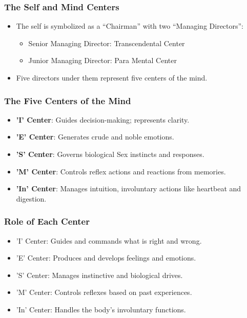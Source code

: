 \begin{frame}[fragile]\frametitle{The Self and Mind Centers}
    \begin{itemize}
        \item The self is symbolized as a ``Chairman'' with two ``Managing Directors'':
        \begin{itemize}
            \item Senior Managing Director: Transcendental Center
            \item Junior Managing Director: Para Mental Center
        \end{itemize}
        \item Five directors under them represent five centers of the mind.
    \end{itemize}
\end{frame}

\begin{frame}[fragile]\frametitle{The Five Centers of the Mind}
    \begin{itemize}
        \item \textbf{'I' Center}: Guides decision-making; represents clarity.
        \item \textbf{'E' Center}: Generates crude and noble emotions.
        \item \textbf{'S' Center}: Governs biological Sex instincts and responses.
        \item \textbf{'M' Center}: Controls reflex actions and reactions from memories.
        \item \textbf{'In' Center}: Manages intuition, involuntary actions like heartbeat and digestion.
    \end{itemize}
\end{frame}

\begin{frame}[fragile]\frametitle{Role of Each Center}
    \begin{itemize}
        \item 'I'  Center: Guides and commands what is right and wrong.
        \item 'E' Center: Produces and develops feelings and emotions.
        \item 'S' Center: Manages instinctive and biological drives.
        \item 'M' Center: Controls reflexes based on past experiences.
        \item 'In' Center: Handles the body’s involuntary functions.
    \end{itemize}
\end{frame}

